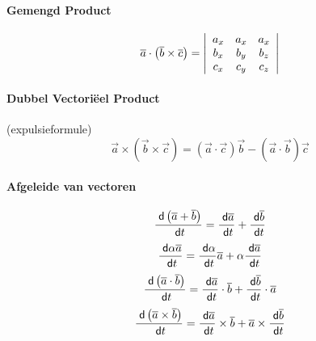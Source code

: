   \paragraph{Gemengd Product}
  \label{sec:GemProduct}
  \[
    \vec{a} \cdot \left( \vec{b} \times \vec{c} \right) =
    \left|
      \begin{array}[h]{ccc}
	       a_x & a_x & a_x \\
	       b_x & b_y & b_z\\
	       c_x & c_y & c_z
      \end{array}
    \right| 
  \]
  
  \paragraph{Dubbel Vectoriëel Product}
  \label{sec:DubVectProduct}
  (expulsieformule)
  \[
    \vec{a} \times \left( \vec{b} \times \vec{c} \right) =
    \left( \vec{a} \cdot \vec{c} \right) \vec{b} - \left( \vec{a} \cdot \vec{b} \right)\vec{c}
  \]
  
  \paragraph{Afgeleide van vectoren}
  \label{sec:AfgVect}
  \[
    \frac{\;\textsf{d}\left(\overline{a} + \overline{b}\right)}{\;\textsf{d}t} = \frac{\;\textsf{d}\overline{a}}{\;\textsf{d}t} +
                                                       \frac{\;\textsf{d}\overline{b}}{\;\textsf{d}t}
  \]
  \[
    \frac{\;\textsf{d}\alpha \overline{a}}{\;\textsf{d}t} = \frac{\;\textsf{d}\alpha}{\;\textsf{d}t} \overline{a} +
                                       \alpha \frac{\;\textsf{d}\overline{a}}{\;\textsf{d}t}  
  \]
  \[
    \frac{\;\textsf{d}\left(\overline{a} \cdot \overline{b}\right)}{\;\textsf{d}t} = \frac{\;\textsf{d}\overline{a}}{\;\textsf{d}t} \cdot \overline{b} + 
                                                           \frac{\;\textsf{d}\overline{b}}{\;\textsf{d}t} \cdot \overline{a}
  \]
  \[
    \frac{\;\textsf{d}\left(\overline{a} \times \overline{b}\right)}{\;\textsf{d}t} = \frac{\;\textsf{d}\overline{a}}{\;\textsf{d}t} \times \overline{b} + 
                                                            \overline{a} \times \frac{\;\textsf{d}\overline{b}}{\;\textsf{d}t} 
  \]

\onecolumn